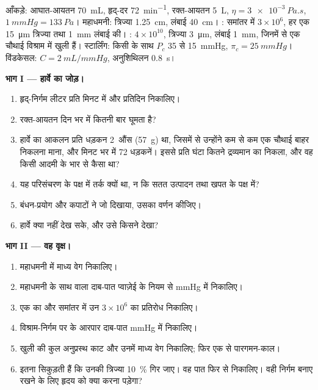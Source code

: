 \begin{problem}
\label{pb:b2:blood-circulation:1}
आँकड़े: आघात-आयतन \qty{70}{mL}, हृद्-दर \qty{72}{min^{-1}},
रक्त-आयतन \qty{5}{L}, $\eta = \qty{3e-3}{Pa.s}$, $\qty{1}{mmHg} =
\qty{133}{Pa}$। महाधमनी: त्रिज्या \qty{1.25}{cm}, लंबाई \qty{40}{cm}।
: समांतर में $3\times 10^{6}$, हर एक
\qty{15}{\micro m} त्रिज्या तथा \qty{1}{mm} लंबाई की। : $4\times
10^{10}$, त्रिज्या \qty{3}{\micro m}, लंबाई \qty{1}{mm}, जिनमें से एक चौथाई
विश्राम में खुली हैं। स्टार्लिंग: किसी  के साथ $P_c$ 35 से
\qty{15}{mmHg}, $\pi_c = \qty{25}{mmHg}$। विंडकेसल: $C =
\qty{2}{mL/mmHg}$, अनुशिथिलन \qty{0.8}{s}।

\medskip
\noindent\textbf{भाग I --- हार्वे का जोड़।}
\begin{enumerate}
  \item हृद्-निर्गम लीटर प्रति मिनट में और प्रतिदिन निकालिए।
  \item रक्त-आयतन दिन भर में कितनी बार घूमता है?
  \item हार्वे का आकलन प्रति धड़कन 2~औंस (\qty{57}{g}) था,
        जिसमें से उन्होंने कम से कम एक चौथाई बाहर निकलना माना, और मिनट
        भर में 72 धड़कनें। इससे प्रति घंटा कितने द्रव्यमान का  निकला, और वह
        किसी आदमी के भार से कैसा था?
  \item यह परिसंचरण के पक्ष में तर्क क्यों था, न कि
        सतत उत्पादन तथा खपत के पक्ष में?
  \item बंधन-प्रयोग और कपाटों ने जो दिखाया, उसका वर्णन कीजिए।
  \item हार्वे क्या नहीं देख सके, और उसे किसने देखा?
\end{enumerate}

\medskip
\noindent\textbf{भाग II --- वह वृक्ष।}
\begin{enumerate}[resume]
  \item महाधमनी में माध्य वेग निकालिए।
  \item महाधमनी के साथ वाला दाब-पात प्वाज़ेई के
        नियम से mmHg में निकालिए।
  \item एक  का और समांतर में उन $3\times
        10^{6}$ का प्रतिरोध निकालिए।
  \item विश्राम-निर्गम पर  के आरपार दाब-पात
        mmHg में निकालिए।
  \item खुली  की कुल अनुप्रस्थ काट और
        उनमें माध्य वेग निकालिए; फिर एक से पारगमन-काल।
  \item {} इतना सिकुड़ती हैं कि उनकी त्रिज्या
        \qty{10}{\%} गिर जाए। वह पात फिर से निकालिए। वही निर्गम बनाए
        रखने के लिए हृदय को क्या करना पड़ेगा?
\end{enumerate}


\end{problem}
